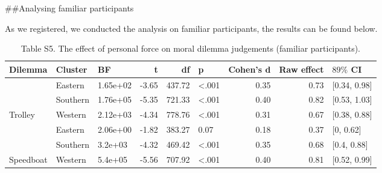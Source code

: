 \documentclass[
]{article}
\begin{document}
\#\#Analysing familiar participants

As we registered, we conducted the analysis on familiar participants,
the results can be found below.

\begin{table}[H]

\caption{\label{tab:Study1ab Bayesian}Table S5. The effect of personal force on moral dilemma judgements (familiar participants).}
\begin{tabular}[t]{lllrrlrrl}
\toprule
\textbf{Dilemma} & \textbf{Cluster} & \textbf{BF} & \textbf{t} & \textbf{df} & \textbf{p} & \textbf{Cohen's d} & \textbf{Raw effect} & \textbf{$89\%$ CI}\\
\midrule
 & Eastern & 1.65e+02 & -3.65 & 437.72 & <.001 & 0.35 & 0.73 & {}[0.34, 0.98]\\

 & Southern & 1.76e+05 & -5.35 & 721.33 & <.001 & 0.40 & 0.82 & {}[0.53, 1.03]\\

\multirow[t]{-3}{*}{\raggedright\arraybackslash Trolley} & Western & 2.12e+03 & -4.34 & 778.76 & <.001 & 0.31 & 0.67 & {}[0.38, 0.88]\\
\cmidrule{1-9}
 & Eastern & 2.06e+00 & -1.82 & 383.27 & 0.07 & 0.18 & 0.37 & {}[0, 0.62]\\

 & Southern & 3.2e+03 & -4.32 & 469.42 & <.001 & 0.35 & 0.68 & {}[0.4, 0.88]\\

\multirow[t]{-3}{*}{\raggedright\arraybackslash Speedboat} & Western & 5.4e+05 & -5.56 & 707.92 & <.001 & 0.40 & 0.81 & {}[0.52, 0.99]\\
\bottomrule
\end{tabular}
\end{table}
\end{document}
